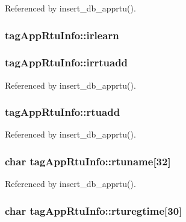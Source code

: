 Referenced by insert\-\_\-db\-\_\-apprtu().

\hypertarget{structtagAppRtuInfo_a1facea1e4a80a6c92aed8bcb7d141165}{
\subsubsection[{irlearn}]{ tag\-App\-Rtu\-Info\-::irlearn}}\label{structtagAppRtuInfo_a1facea1e4a80a6c92aed8bcb7d141165}
\hypertarget{structtagAppRtuInfo_a868cfa5637ef8689900e576265382e67}{
\subsubsection[{irrtuadd}]{ tag\-App\-Rtu\-Info\-::irrtuadd}}\label{structtagAppRtuInfo_a868cfa5637ef8689900e576265382e67}


Referenced by insert\-\_\-db\-\_\-apprtu().

\hypertarget{structtagAppRtuInfo_aa763eb3681fe89a03dcf87c79ac6df63}{
\subsubsection[{rtuadd}]{ tag\-App\-Rtu\-Info\-::rtuadd}}\label{structtagAppRtuInfo_aa763eb3681fe89a03dcf87c79ac6df63}


Referenced by insert\-\_\-db\-\_\-apprtu().

\hypertarget{structtagAppRtuInfo_a975da1456b430065bede03ccc568ea23}{
\subsubsection[{rtuname}]{\setlength{\rightskip}{0pt plus 5cm}char tag\-App\-Rtu\-Info\-::rtuname\mbox{[}32\mbox{]}}}\label{structtagAppRtuInfo_a975da1456b430065bede03ccc568ea23}


Referenced by insert\-\_\-db\-\_\-apprtu().

\hypertarget{structtagAppRtuInfo_a0d11ebdeaf5f73682276b9a089d53037}{
\subsubsection[{rturegtime}]{\setlength{\rightskip}{0pt plus 5cm}char tag\-App\-Rtu\-Info\-::rturegtime\mbox{[}30\mbox{]}}}\label{structtagAppRtuInfo_a0d11ebdeaf5f73682276b9a089d53037}


